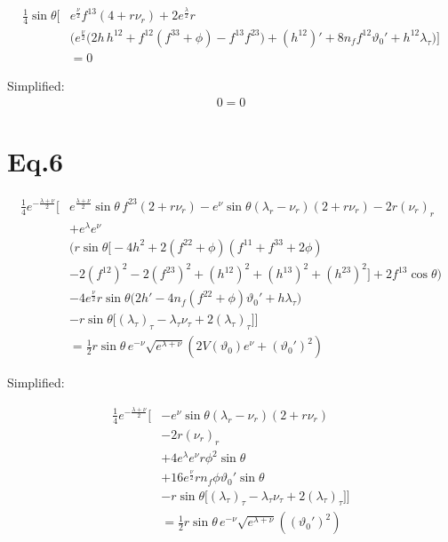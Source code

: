 \documentclass[12pt]{article}
\begin{document}
\begin{align*}
\frac{1}{4} \sin\theta \Big[
 & e^{\frac{\nu}{2}} f^{13} \left( 4 + r \nu_r \right)
 + 2 e^{\frac{\lambda}{2}} r \\ &\Big(
     e^{\frac{\nu}{2}} \big(
       2h\,h^{12}
       + f^{12}(f^{33} + \phi)
       - f^{13} f^{23}
     \big)
     + (h^{12})'
     + 8n_f f^{12} \vartheta_0'
     + h^{12} \lambda_\tau
   \Big)
\Big] \\ &= 0
\end{align*}

Simplified:
\begin{align*}
0 = 0
\end{align*}

\section*{Eq.6}

\begin{align*}
\frac{1}{4} e^{-\frac{\lambda + \nu}{2}} \Big[
 & e^{\frac{\lambda + \nu}{2}} \sin\theta\, f^{23}\left(2 + r\nu_r\right)
 - e^{\nu} \sin\theta
   \left( \lambda_r - \nu_r \right) \left(2 + r\nu_r\right)
 - 2r (\nu_r)_r\\
 & + e^{\lambda} e^{\nu} \\
   &\Big(
     r \sin\theta
       \big[
         -4h^2
         + 2(f^{22} + \phi)(f^{11} + f^{33} + 2\phi) \\
         &- 2(f^{12})^2 - 2(f^{23})^2
         + (h^{12})^2 + (h^{13})^2 + (h^{23})^2
       \big]
     + 2f^{13}\cos\theta
   \Big) \\
 & - 4 e^{\frac{\nu}{2}} r \sin\theta
   \Big(
     2h'
     - 4n_f (f^{22} + \phi)\vartheta_0'
     + h\lambda_\tau
   \Big) \\
 &- r \sin\theta
   \Big[
     (\lambda_\tau)_\tau
     - \lambda_\tau \nu_\tau
     + 2(\lambda_\tau)_\tau
   \Big]
\Big]
\nonumber \\
&= \frac{1}{2} r \sin\theta\, e^{-\nu} \sqrt{e^{\lambda + \nu}}
   \left(2V(\vartheta_0)e^{\nu} + (\vartheta_0')^2\right)
\end{align*}

Simplified:

\begin{align*}
\frac{1}{4} e^{-\frac{\lambda + \nu}{2}} \Big[
 &- e^{\nu} \sin\theta
   \left( \lambda_r - \nu_r \right) \left(2 + r\nu_r\right) \\
 & - 2r (\nu_r)_r\\
 & + 4 e^{\lambda} e^{\nu} r\phi^2 \sin\theta \\
 & + 16 e^{\frac{\nu}{2}} r n_f\phi\vartheta_0' \sin\theta\\
 & - r \sin\theta
   \Big[
     (\lambda_\tau)_\tau
     - \lambda_\tau \nu_\tau
     + 2(\lambda_\tau)_\tau
   \Big]
\Big] \\
&= \frac{1}{2} r \sin\theta\, e^{-\nu} \sqrt{e^{\lambda + \nu}}
   \left((\vartheta_0')^2\right)
\end{align*}
\end{document}
